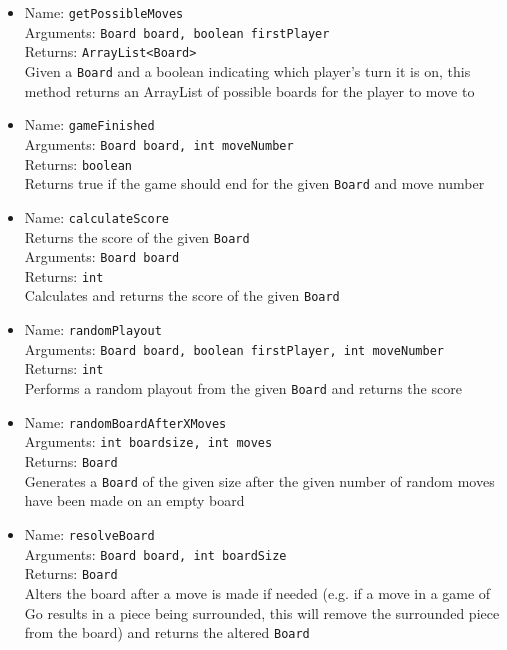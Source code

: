 \begin{itemize}
\item Name: \texttt{getPossibleMoves}\\
Arguments: \texttt{Board board, boolean firstPlayer}\\
Returns: \texttt{ArrayList<Board>}\\
Given a \texttt{Board} and a boolean indicating which player's turn it is on, this method returns an ArrayList of possible boards for the player to move to

\item Name: \texttt{gameFinished}\\
Arguments: \texttt{Board board, int moveNumber}\\
Returns: \texttt{boolean}\\
Returns true if the game should end for the given \texttt{Board} and move number

\item Name: \texttt{calculateScore}\\
Returns the score of the given \texttt{Board}\\
Arguments: \texttt{Board board}\\
Returns: \texttt{int}\\
Calculates and returns the score of the given \texttt{Board}

\item Name: \texttt{randomPlayout}\\
Arguments: \texttt{Board board, boolean firstPlayer, int moveNumber}\\
Returns: \texttt{int}\\
Performs a random playout from the given \texttt{Board} and returns the score

\item Name: \texttt{randomBoardAfterXMoves}\\
Arguments: \texttt{int boardsize, int moves}\\
Returns: \texttt{Board}\\
Generates a \texttt{Board} of the given size after the given number of random moves have been made on an empty board

\item Name: \texttt{resolveBoard}\\
Arguments: \texttt{Board board, int boardSize}\\
Returns: \texttt{Board}\\
Alters the board after a move is made if needed (e.g. if a move in a game of Go results in a piece being surrounded, this will remove the surrounded piece from the board) and returns the altered \texttt{Board}
\end{itemize}

